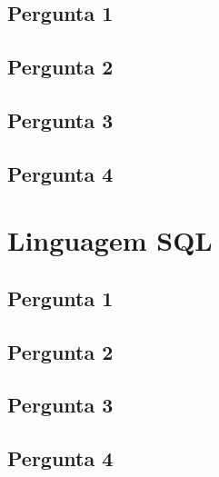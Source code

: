 \documentclass[11pt,a4paper]{article}
\begin{document}
\subsection{Pergunta 1}
\subsection{Pergunta 2}
\subsection{Pergunta 3}
\subsection{Pergunta 4}

\section{Linguagem SQL}
\subsection{Pergunta 1}
\subsection{Pergunta 2}
\subsection{Pergunta 3}
\subsection{Pergunta 4}
\end{document}
